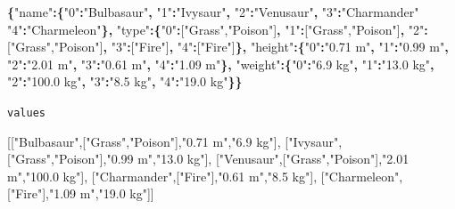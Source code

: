 \documentclass[
]{book}
\newenvironment{Shaded}{\begin{snugshade}}{\end{snugshade}}
\newcommand{\DataTypeTok}[1]{\textcolor[rgb]{0.13,0.29,0.53}{#1}}
\newcommand{\ErrorTok}[1]{\textcolor[rgb]{0.64,0.00,0.00}{\textbf{#1}}}
\newcommand{\FunctionTok}[1]{\textcolor[rgb]{0.13,0.29,0.53}{\textbf{#1}}}
\newcommand{\OtherTok}[1]{\textcolor[rgb]{0.56,0.35,0.01}{#1}}
\newcommand{\StringTok}[1]{\textcolor[rgb]{0.31,0.60,0.02}{#1}}
\begin{document}
\begin{Shaded}
\begin{Highlighting}[]
\FunctionTok{\{}\DataTypeTok{"name"}\FunctionTok{:\{}\DataTypeTok{"0"}\FunctionTok{:}\StringTok{"Bulbasaur"}\FunctionTok{,}
         \DataTypeTok{"1"}\FunctionTok{:}\StringTok{"Ivysaur"}\FunctionTok{,}
         \DataTypeTok{"2"}\FunctionTok{:}\StringTok{"Venusaur"}\FunctionTok{,}
         \DataTypeTok{"3"}\FunctionTok{:}\StringTok{"Charmander"}
         \StringTok{"4"}\ErrorTok{:}\StringTok{"Charmeleon"}\FunctionTok{\},}
 \DataTypeTok{"type"}\FunctionTok{:\{}\DataTypeTok{"0"}\FunctionTok{:}\OtherTok{[}\StringTok{"Grass"}\OtherTok{,}\StringTok{"Poison"}\OtherTok{]}\FunctionTok{,}
         \DataTypeTok{"1"}\FunctionTok{:}\OtherTok{[}\StringTok{"Grass"}\OtherTok{,}\StringTok{"Poison"}\OtherTok{]}\FunctionTok{,}
         \DataTypeTok{"2"}\FunctionTok{:}\OtherTok{[}\StringTok{"Grass"}\OtherTok{,}\StringTok{"Poison"}\OtherTok{]}\FunctionTok{,}
         \DataTypeTok{"3"}\FunctionTok{:}\OtherTok{[}\StringTok{"Fire"}\OtherTok{]}\FunctionTok{,}
         \DataTypeTok{"4"}\FunctionTok{:}\OtherTok{[}\StringTok{"Fire"}\OtherTok{]}\FunctionTok{\},}
 \DataTypeTok{"height"}\FunctionTok{:\{}\DataTypeTok{"0"}\FunctionTok{:}\StringTok{"0.71 m"}\FunctionTok{,}
           \DataTypeTok{"1"}\FunctionTok{:}\StringTok{"0.99 m"}\FunctionTok{,}
           \DataTypeTok{"2"}\FunctionTok{:}\StringTok{"2.01 m"}\FunctionTok{,}
           \DataTypeTok{"3"}\FunctionTok{:}\StringTok{"0.61 m"}\FunctionTok{,}
           \DataTypeTok{"4"}\FunctionTok{:}\StringTok{"1.09 m"}\FunctionTok{\},}
 \DataTypeTok{"weight"}\FunctionTok{:\{}\DataTypeTok{"0"}\FunctionTok{:}\StringTok{"6.9 kg"}\FunctionTok{,}
           \DataTypeTok{"1"}\FunctionTok{:}\StringTok{"13.0 kg"}\FunctionTok{,}
           \DataTypeTok{"2"}\FunctionTok{:}\StringTok{"100.0 kg"}\FunctionTok{,}
           \DataTypeTok{"3"}\FunctionTok{:}\StringTok{"8.5 kg"}\FunctionTok{,}
           \DataTypeTok{"4"}\FunctionTok{:}\StringTok{"19.0 kg"}\FunctionTok{\}\}}
\end{Highlighting}
\end{Shaded}

\texttt{values}

\begin{Shaded}
\begin{Highlighting}[]
\OtherTok{[[}\StringTok{"Bulbasaur"}\OtherTok{,[}\StringTok{"Grass"}\OtherTok{,}\StringTok{"Poison"}\OtherTok{],}\StringTok{"0.71 m"}\OtherTok{,}\StringTok{"6.9 kg"}\OtherTok{],}
 \OtherTok{[}\StringTok{"Ivysaur"}\OtherTok{,[}\StringTok{"Grass"}\OtherTok{,}\StringTok{"Poison"}\OtherTok{],}\StringTok{"0.99 m"}\OtherTok{,}\StringTok{"13.0 kg"}\OtherTok{],}
 \OtherTok{[}\StringTok{"Venusaur"}\OtherTok{,[}\StringTok{"Grass"}\OtherTok{,}\StringTok{"Poison"}\OtherTok{],}\StringTok{"2.01 m"}\OtherTok{,}\StringTok{"100.0 kg"}\OtherTok{],}
 \OtherTok{[}\StringTok{"Charmander"}\OtherTok{,[}\StringTok{"Fire"}\OtherTok{],}\StringTok{"0.61 m"}\OtherTok{,}\StringTok{"8.5 kg"}\OtherTok{],}
 \OtherTok{[}\StringTok{"Charmeleon"}\OtherTok{,[}\StringTok{"Fire"}\OtherTok{],}\StringTok{"1.09 m"}\OtherTok{,}\StringTok{"19.0 kg"}\OtherTok{]]}
\end{Highlighting}
\end{Shaded}
\end{document}
